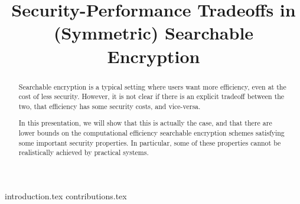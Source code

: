 \documentclass[letterpaper,twocolumn,10pt]{article}
\begin{document}
	
	\title{Security-Performance Tradeoffs in (Symmetric) Searchable Encryption}
	
	\iftoggle{anon}{
		\author{
		\alignauthor
		Anonymous submission
		}
	}{
	\author{\underline{Raphael Bost}\thanks{(Speaker) Direction Générale de l'Armement - Maîtrise de l'Information \& Université de Rennes 1, France. The views and conclusions contained herein are those of the author and should not be interpreted as necessarily representing the official policies or endorsements, either expressed or implied, of the DGA or the French Government.
	email: \href{mailto:raphael_bost@alumni.brown.edu}{\nolinkurl{raphael_bost@alumni.brown.edu}}
	}
	\and
	Pierre-Alain Fouque\thanks{Université de Rennes 1.
	email: \href{mailto:pierre-alain.fouque@ens.fr}{\nolinkurl{pierre-alain.fouque@ens.fr}}}
	\and 
	David Pointcheval\thanks{Ecole Normale Supérieure.
	email: \href{mailto:david.pointcheval@ens.fr}{\nolinkurl{david.pointcheval@ens.fr}}}
	}
	
	}	
	
	\date{}
	
	\maketitle 
	
	\begin{abstract}
		Searchable encryption is a typical setting where users want more efficiency, even at the cost of less security. 
		However, it is not clear if there is an explicit tradeoff between the two, \ie that efficiency has some security costs, and vice-versa.
		
		In this presentation, we will show that this is actually the case, and that there are lower bounds on the computational efficiency searchable encryption schemes satisfying some important security properties.
		In particular, some of these properties cannot be realistically achieved by practical systems.
	\end{abstract}
	
	{introduction.tex}
	{contributions.tex}
	
	
	
	
\end{document}
